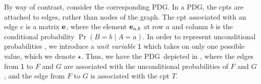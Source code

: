 \documentclass{article}
\newcommand{\MN}{PDG}
\numberwithin{equation}{section}
\begin{document}
\begin{notfocus}
\begin{example}
		By way of contrast, consider the corresponding \MN. In a \MN, the cpts
		are attached to edges, rather than nodes of the graph.  
		The cpt associated with an edge $e$ is a matrix
		$\mathbf e$, where the element $\mathbf e_{a,b}$ at row $a$ and column $b$
		is the conditional probability $\Pr(B \!\!=\!\!b \mid A \!\!=\!\! a)$.  
		In order to represent unconditional probabilities%
		, we introduce a \emph{unit variable} $\mathsf 1$ %
		which takes on only one possible value,	which we denote $\star$.
%		
		Thus, we have the \MN\ depicted in , where the edges from $\mathsf 1$ to $F$ and $G$ are
		associated with the unconditional probabilities of $F$ and
		$G$, and the edge from $F$ to $G$ is associated with
		the cpt $T$.
		\begin{figure}[h]
			\centering
\end{figure}
\end{example}
\end{notfocus}
\end{document}
